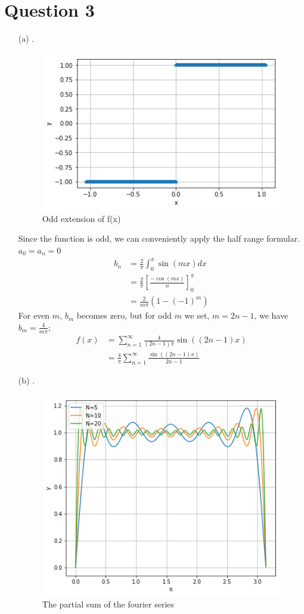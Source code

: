 \documentclass[12pt,a4paper]{article}
\begin{document}
\section*{Question 3}
\begin{itemize}
	\item [(a)]
	.\\
	\begin{figure}[h!]
		\centering
		\includegraphics[scale=0.6]{Image1.png}
		\caption{Odd extension of f(x)}
	\end{figure}
	
	Since the function is odd, we can conveniently apply the half range formular. $a_{0}=a_{n}=0$
	\begin{align*}
	b_{n}&=\frac{2}{\pi}\int_{0}^{\pi}\sin(m x)dx\\
	&=\frac{2}{\pi}\left[\frac{-\cos(m  x)}{n}\right]^{\pi}_{0}\\
	&=\frac{2}{m\pi}\left(1-(-1)^{m}\right)
	\end{align*}
	For even $m$, $b_{m}$ becomes zero, but for odd $m$ we set, $m=2n-1$, we have $b_{m}=\frac{4}{m\pi}$;
	\begin{align}
	f(x)&=\sum_{n=1}^{\infty}\frac{4}{(2n-1)\pi}\sin((2n-1) x)\\
	&=\frac{4}{\pi}\sum_{n=1}^{\infty}\frac{\sin((2n-1) x)}{2n-1} \label{15}
	\end{align}
	\newpage
	\item[(b)]
	.\\
	\begin{figure}[h!]
		\centering
		\includegraphics[scale=0.6]{Image2.png}
		\caption{The partial sum of the fourier series}
	\end{figure}


\end{itemize}
\end{document}
